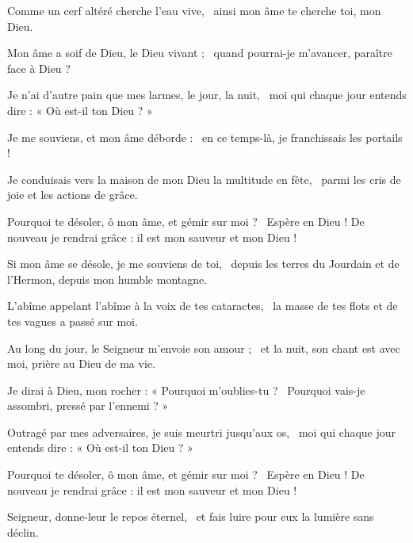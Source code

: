 \item Comme un cerf altéré cherche l'eau vive,~\psstar{} ainsi mon âme te cherche toi, mon Dieu.

\item Mon âme a soif de Dieu, le Dieu vivant ;~\psstar{} quand pourrai-je m'avancer, paraître face à Dieu ?

\item Je n'ai d'autre pain que mes larmes, le jour, la nuit,~\psstar{} moi qui chaque jour entends dire : « Où est-il ton Dieu ? »

\item Je me souviens, et mon âme déborde :~\psstar{} en ce temps-là, je franchissais les portails ! 

\item Je conduisais vers la maison de mon Dieu la multitude en fête,~\psstar{} parmi les cris de joie et les actions de grâce.

\item Pourquoi te désoler, ô mon âme, et gémir sur moi ?~\psstar{} Espère en Dieu ! De nouveau je rendrai grâce : il est mon sauveur et mon Dieu !

\item Si mon âme se désole, je me souviens de toi,~\psstar{} depuis les terres du Jourdain et de l'Hermon, depuis mon humble montagne.

\item L'abîme appelant l'abîme à la voix de tes cataractes,~\psstar{} la masse de tes flots et de tes vagues a passé sur moi.

\item Au long du jour, le Seigneur m'envoie son amour ;~\psstar{} et la nuit, son chant est avec moi, prière au Dieu de ma vie.

\item Je dirai à Dieu, mon rocher : « Pourquoi m'oublies-tu ?~\psstar{} Pourquoi vais-je assombri, pressé par l'ennemi ? »

\item Outragé par mes adversaires, je suis meurtri jusqu'aux os,~\psstar{} moi qui chaque jour entends dire : « Où est-il ton Dieu ? »

\item Pourquoi te désoler, ô mon âme, et gémir sur moi ?~\psstar{} Espère en Dieu ! De nouveau je rendrai grâce : il est mon sauveur et mon Dieu !

\item Seigneur, donne-leur le repos éternel,~\psstar{} et fais luire pour eux la lumière sans déclin.